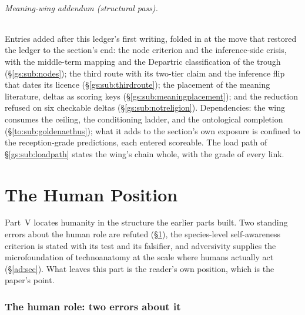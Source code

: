 \documentclass[11pt]{article}
\numberwithin{equation}{section}
\theoremstyle{plain}
\theoremstyle{definition}
\theoremstyle{remark}
\begin{document}
\paragraph{Meaning-wing addendum (structural pass).} Entries added
after this ledger's first writing, folded in at the move that restored
the ledger to the section's end: the node criterion and the
inference-side crisis, with the middle-term mapping and the Departric
classification of the trough (\S\ref{gs:sub:nodes}); the third route
with its two-tier claim and the inference flip that dates its
licence (\S\ref{gs:sub:thirdroute}); the placement of the meaning
literature, deltas as scoring keys (\S\ref{gs:sub:meaningplacement});
and the reduction refused on six checkable deltas
(\S\ref{gs:sub:notreligion}). Dependencies: the wing consumes the
ceiling, the conditioning ladder, and the ontological completion
(\S\ref{to:sub:goldenaethus}); what it adds to the section's own
exposure is confined to the reception-grade predictions, each entered
scoreable. The load path of \S\ref{gs:sub:loadpath} states the
wing's chain whole, with the grade of every link.

\part{The Human Position}

\noindent Part~V locates humanity in the structure the earlier parts
built. Two standing errors about the human role are refuted
(\S\ref{hr:sec}), the species-level self-awareness criterion is
stated with its test and its falsifier, and adversivity supplies the
microfoundation of technoanatomy at the scale where humans actually
act (\S\ref{ad:sec}). What leaves this part is the reader's own
position, which is the paper's point.

\section{The human role: two errors about it}\label{hr:sec}
\end{document}
